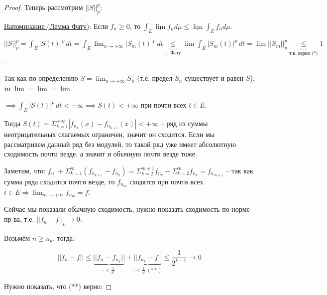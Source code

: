 \begin{proof}
    Теперь рассмотрим $|| S ||^p_p$:

    \underline{Напоминание (Лемма Фату)}: Если $f_n \geq 0$, то $\int_E{\underline{\lim}{f_n d \mu}} \leq \underline{\lim}{\int_E{f_n d \mu}}$.

    $||S||^p_p = \int_{E} |S(t)|^p \, dt = \int_E \lim_{n \to +\infty} |S_m(t)|^p \, dt \underbrace{\leqslant}_{\text{л. Фату}} \underline{\lim} \int_E |S_m(t)|^p \, dt =
    \underline{\lim} ||S_m ||^p_p \underbrace{\leqslant}_{\text{т.к. верно (*)}} 1 $.

    Так как по определению $S = \lim_{n\rightarrow +\infty} S_n$ (т.е. предел $S_n$ существует и равен $S$), то $\underline{\lim} = \lim = \bar{\lim}$.

    $ \implies \int_E |S(t)|^p \, dt < +\infty \implies S(t) < +\infty$ при почти всех $t \in E$.

    Тогда $S(t) = \Sigma_{k=1}^{+\infty} |f_{n_k}(x) - f_{n_{k+1}}(x)| < +\infty$ -- ряд из суммы неотрицательных слагаемых ограничен, значит он сходится. Если мы рассматривем данный ряд без модулей, то такой ряд уже имеет абсолютную сходимость почти везде, а значит и обычную почти везде тоже.\newline

    Заметим, что: $f_{n_1} + \Sigma_{k=1}^{m} (f_{n_{k+1}} - f_{n_k}) = \Sigma_{k=2}^{m+1} f_{n_k} - \Sigma_{k=2}^{m} f_{n_k} = f_{n_{m+1}}$ -- так как сумма ряда сходится почти везде, то $f_{n_m}$ сходятся при почти всех $t \in E \Rightarrow \lim_{m\rightarrow +\infty} f_{n_m} = f$.\newline

    Сейчас мы показали обычную сходимость, нужно показать сходимость по норме пр-ва, т.е. $|| f_n - f ||_p \rightarrow 0$:



    Возьмём $n \geqslant n_k$, тогда:

    $$||f_n - f|| \leqslant \underbrace{||f_n - f_{n_k}||}_{\cdot < \frac{1}{2^k}} + \underbrace{||f_{n_k} - f||}_{\cdot < \frac{1}{2^k} \ (**)} \leqslant \frac{1}{2^{k-1}} \rightarrow 0$$

    Нужно показать, что (**) верно:


\end{proof}
